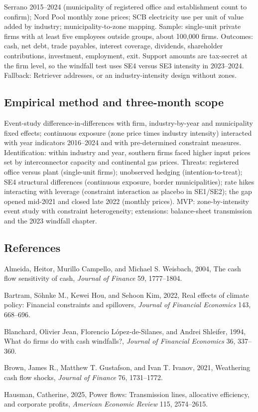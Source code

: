 \documentclass[12pt,a4paper]{article}
\newenvironment{refs}{\begin{list}{}{\setlength{\leftmargin}{1.5em}\setlength{\itemindent}{-1.5em}\setlength{\itemsep}{1pt}}}{\end{list}}
\begin{document}
Serrano 2015--2024 (municipality of registered office and establishment count to confirm); Nord Pool monthly zone prices; SCB electricity use per unit of value added by industry; municipality-to-zone mapping. Sample: single-unit private firms with at least five employees outside groups, about 100,000 firms. Outcomes: cash, net debt, trade payables, interest coverage, dividends, shareholder contributions, investment, employment, exit. Support amounts are tax-secret at the firm level, so the windfall test uses SE4 versus SE3 intensity in 2023--2024. Fallback: Retriever addresses, or an industry-intensity design without zones.

\subsection{Empirical method and three-month scope}

Event-study difference-in-differences with firm, industry-by-year and municipality fixed effects; continuous exposure (zone price times industry intensity) interacted with year indicators 2016--2024 and with pre-determined constraint measures. Identification: within industry and year, southern firms faced higher input prices set by interconnector capacity and continental gas prices. Threats: registered office versus plant (single-unit firms); unobserved hedging (intention-to-treat); SE4 structural differences (continuous exposure, border municipalities); rate hikes interacting with leverage (constraint interaction as placebo in SE1/SE2); the gap opened mid-2021 and closed late 2022 (monthly prices). MVP: zone-by-intensity event study with constraint heterogeneity; extensions: balance-sheet transmission and the 2023 windfall chapter.

\subsection*{References}
\begin{refs}
\item Almeida, Heitor, Murillo Campello, and Michael S. Weisbach, 2004, The cash flow sensitivity of cash, \emph{Journal of Finance} 59, 1777--1804.
\item Bartram, S\"ohnke M., Kewei Hou, and Sehoon Kim, 2022, Real effects of climate policy: Financial constraints and spillovers, \emph{Journal of Financial Economics} 143, 668--696.
\item Blanchard, Olivier Jean, Florencio L\'opez-de-Silanes, and Andrei Shleifer, 1994, What do firms do with cash windfalls?, \emph{Journal of Financial Economics} 36, 337--360.
\item Brown, James R., Matthew T. Gustafson, and Ivan T. Ivanov, 2021, Weathering cash flow shocks, \emph{Journal of Finance} 76, 1731--1772.
\item Hausman, Catherine, 2025, Power flows: Transmission lines, allocative efficiency, and corporate profits, \emph{American Economic Review} 115, 2574--2615.
\end{refs}
\end{document}
